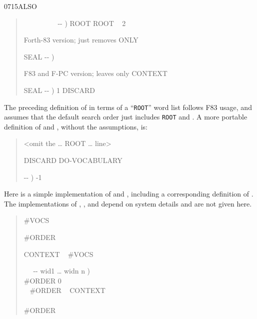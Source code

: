 \begin{worddef}{0715}{ALSO}
\begin{defer}
\begin{quote}
		\word{:}  ~~~~~~~~~ -{}- )
			ROOT ROOT ~ 2 
		\word{;}

		 Forth-83 version; just removes ONLY

		\word{:} SEAL  -{}- )
			 
			 
		\word{;}

		 F83 and F-PC version; leaves only CONTEXT

		\word{:} SEAL  -{}- )
			 
			1  DISCARD
		\word{;}
		\end{quote}

		The preceding definition of  in terms of a
		``\texttt{ROOT}'' word list follows F83 usage, and assumes
		that the default search order just includes \texttt{ROOT} and
		. A more portable definition of  and
		, without the assumptions, is:
		\begin{quote}\ttfamily
		<omit the {\ldots}
			  ROOT
		{\ldots} line>

		  
			 \word[core]{,} DISCARD DO-VOCABULARY

		\word[core]{:}   -{}- )
			-1 
		\word[core]{;}
		\end{quote}

		Here is a simple implementation of  and
		, including a corresponding definition of
		. The implementations of ,
		,  and
		 depend on system details and are not given
		here.

		\begin{quote}  \#VOCS

		 \#ORDER

		 CONTEXT ~ \#VOCS  

		\word{:} ~~ -{}- wid1 {\ldots} widn n ) \\
		\tab \#ORDER  0  \\
		\tab~ \#ORDER  ~  \word{-}
			    CONTEXT \word{+}  \\
		\tab {} \\
		\tab \#ORDER  \\
		\word{;}


\end{quote}
\end{defer}
\end{worddef}
